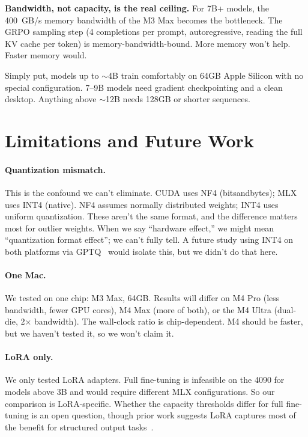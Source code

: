 \documentclass[11pt]{article}
\begin{document}
\textbf{Bandwidth, not capacity, is the real ceiling.}  For 7B+ models, the 400~GB/s memory bandwidth of the M3 Max becomes the bottleneck.  The GRPO sampling step (4 completions per prompt, autoregressive, reading the full KV cache per token) is memory-bandwidth-bound.  More memory won't help.  Faster memory would.

Simply put, models up to $\sim$4B train comfortably on 64GB Apple Silicon with no special configuration.  7--9B models need gradient checkpointing and a clean desktop.  Anything above $\sim$12B needs 128GB or shorter sequences.


\section{Limitations and Future Work}

\paragraph{Quantization mismatch.}
This is the confound we can't eliminate.  CUDA uses NF4 (bitsandbytes); MLX uses INT4 (native).  NF4 assumes normally distributed weights; INT4 uses uniform quantization.  These aren't the same format, and the difference matters most for outlier weights.  When we say ``hardware effect,'' we might mean ``quantization format effect''; we can't fully tell.  A future study using INT4 on both platforms via GPTQ~\citep{frantar2023gptq} would isolate this, but we didn't do that here.

\paragraph{One Mac.}
We tested on one chip: M3 Max, 64GB.  Results will differ on M4 Pro (less bandwidth, fewer GPU cores), M4 Max (more of both), or the M4 Ultra (dual-die, 2$\times$ bandwidth).  The wall-clock ratio is chip-dependent.  M4 should be faster, but we haven't tested it, so we won't claim it.

\paragraph{LoRA only.}
We only tested LoRA adapters.  Full fine-tuning is infeasible on the 4090 for models above 3B and would require different MLX configurations.  So our comparison is LoRA-specific.  Whether the capacity thresholds differ for full fine-tuning is an open question, though prior work suggests LoRA captures most of the benefit for structured output tasks~\citep{hu2021lora}.
\end{document}
